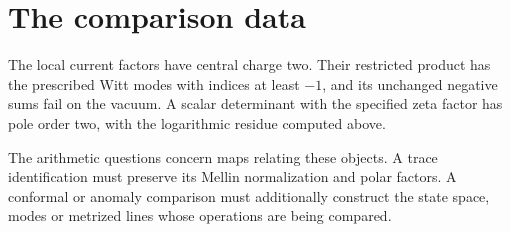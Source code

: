 \section{The comparison data}
\label{v4-arith:pol:arakelov-zeta-structure}

The local current factors have central charge two.
Their restricted product has the prescribed Witt modes with
indices at least \(-1\), and its unchanged negative sums fail
on the vacuum. A scalar determinant with the specified
zeta factor has pole order two, with the logarithmic residue
computed above.

The arithmetic questions concern maps relating these objects.
A trace identification must preserve its Mellin normalization
and polar factors. A conformal or anomaly comparison must
additionally construct the state space, modes or metrized lines
whose operations are being compared.
